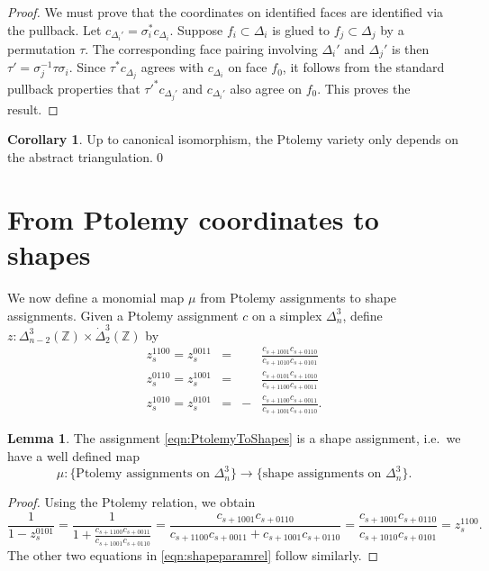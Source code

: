 \documentclass[12pt]{amsart}
\theoremstyle{definition}
\newtheorem{lemma}[theorem]{Lemma}
\newtheorem{corollary}[theorem]{Corollary}
\numberwithin{equation}{section}
\def\Z{\mathbb{Z}}
\begin{document}
\begin{proof} We must prove that the coordinates on identified faces are identified via the pullback.
Let $c_{\Delta_i'}=\sigma_i^*c_{\Delta_i}$. Suppose $f_i\subset\Delta_i$ is glued to $f_j\subset\Delta_j$ by a permutation $\tau$. The corresponding face pairing involving $\Delta_i'$ and $\Delta_j'$ is then $\tau'=\sigma_j^{-1}\tau\sigma_i$. Since $\tau^*c_{\Delta_j}$ agrees with $c_{\Delta_i}$ on face $f_0$, it follows from the standard pullback properties that $\tau'^*c_{\Delta_j'}$ and $c_{\Delta_i'}$ also agree on $f_0$. This proves the result.
\end{proof}
\begin{corollary}
Up to canonical isomorphism, the Ptolemy variety only depends on the abstract triangulation.\qed
\end{corollary}

\section{From Ptolemy coordinates to shapes}\label{sec:PtolemyToShapes}

We now define a monomial map $\mu$ from Ptolemy assignments to shape assignments.
Given a Ptolemy assignment $c$ on a simplex $\Delta^3_n$, define $z\colon\Delta^3_{n-2}(\Z)\times\dot\Delta_2^3(\Z)$ by
\begin{equation}\label{eqn:PtolemyToShapes}
\begin{aligned}
z_s^{1100}  = z_s^{0011} & = & & \frac{c_{s+1001}c_{s+0110}}{c_{s+1010}c_{s+0101}}\\
z_s^{0110}  = z_s^{1001} & =  & & \frac{c_{s+0101}c_{s+1010}}{c_{s+1100}c_{s+0011}}\\
z_s^{1010}  = z_s^{0101} & =  & - & \frac{c_{s+1100}c_{s+0011}}{c_{s+1001}c_{s+0110}}.
\end{aligned}
\end{equation}

\begin{lemma}
The assignment \eqref{eqn:PtolemyToShapes} is a shape assignment, i.e.~we have a well defined map 
\begin{equation}\mu\colon\text{\{Ptolemy assignments on $\Delta^3_n$\}}\to \text{\{shape assignments on $\Delta^3_n$\}}.
\end{equation}
\end{lemma}

\begin{proof}
Using the Ptolemy relation, we obtain
$$\frac{1}{1-z_s^{0101}}=\frac{1}{1+\frac{c_{s+1100}c_{s+0011}}{c_{s+1001}c_{s+0110}}}=\frac{c_{s+1001}c_{s+0110}}{c_{s+1100}c_{s+0011}+c_{s+1001}c_{s+0110}}=\frac{c_{s+1001}c_{s+0110}}{c_{s+1010}c_{s+0101}}=z_s^{1100}.$$
The other two equations in \eqref{eqn:shapeparamrel} follow similarly.
\end{proof}
\end{document}
